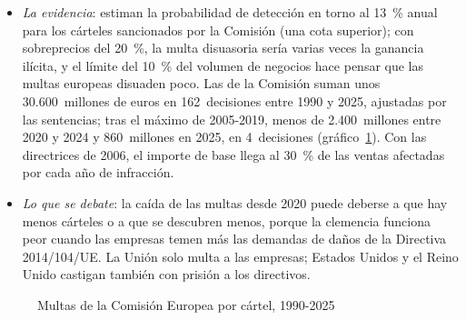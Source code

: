 \documentclass[11pt]{article}
\begin{document}
\begin{itemize}
\begin{itemize}
  \item \emph{La evidencia}: \textcite{CombeMonnierLegal2008Cartels} estiman la probabilidad de detección en torno al 13~\% anual para los cárteles sancionados por la Comisión (una cota superior); con sobreprecios del 20~\%, la multa disuasoria sería varias veces la ganancia ilícita, y el límite del 10~\% del volumen de negocios hace pensar que las multas europeas disuaden poco. Las de la Comisión suman unos 30.600~millones de euros en 162~decisiones entre 1990 y 2025, ajustadas por las sentencias; tras el máximo de 2005-2019, menos de 2.400~millones entre 2020 y 2024 y 860~millones en 2025, en 4~decisiones (gráfico~\ref{fig:multas})\nocite{CE2026Carteles}. Con las directrices de 2006, el importe de base llega al 30~\% de las ventas afectadas por cada año de infracción.
  \item \emph{Lo que se debate}: la caída de las multas desde 2020 puede deberse a que hay menos cárteles o a que se descubren menos, porque la clemencia funciona peor cuando las empresas temen más las demandas de daños de la Directiva 2014/104/UE. La Unión solo multa a las empresas; Estados Unidos y el Reino Unido castigan también con prisión a los directivos.
  \end{itemize}
\end{itemize}

\begin{figure}[H]
\centering
\caption{Multas de la Comisión Europea por cártel, 1990-2025}\label{fig:multas}
\end{figure}
\end{document}
